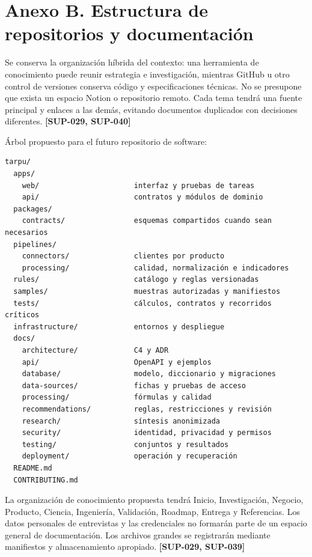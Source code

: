 \documentclass[10pt,a4paper]{article}
\begin{document}
\clearpage\section{Anexo B. Estructura de repositorios y documentación}\label{anexo-b-estructura-de-repositorios-y-documentación}

Se conserva la organización híbrida del contexto: una herramienta de conocimiento puede reunir estrategia e investigación, mientras GitHub u otro control de versiones conserva código y especificaciones técnicas. No se presupone que exista un espacio Notion o repositorio remoto. Cada tema tendrá una fuente principal y enlaces a las demás, evitando documentos duplicados con decisiones diferentes. \textbf{[SUP-029, SUP-040]}


Árbol propuesto para el futuro repositorio de software:


\begin{lstlisting}
tarpu/
  apps/
    web/                      interfaz y pruebas de tareas
    api/                      contratos y módulos de dominio
  packages/
    contracts/                esquemas compartidos cuando sean necesarios
  pipelines/
    connectors/               clientes por producto
    processing/               calidad, normalización e indicadores
  rules/                      catálogo y reglas versionadas
  samples/                    muestras autorizadas y manifiestos
  tests/                      cálculos, contratos y recorridos críticos
  infrastructure/             entornos y despliegue
  docs/
    architecture/             C4 y ADR
    api/                      OpenAPI y ejemplos
    database/                 modelo, diccionario y migraciones
    data-sources/             fichas y pruebas de acceso
    processing/               fórmulas y calidad
    recommendations/          reglas, restricciones y revisión
    research/                 síntesis anonimizada
    security/                 identidad, privacidad y permisos
    testing/                  conjuntos y resultados
    deployment/               operación y recuperación
  README.md
  CONTRIBUTING.md
\end{lstlisting}

La organización de conocimiento propuesta tendrá Inicio, Investigación, Negocio, Producto, Ciencia, Ingeniería, Validación, Roadmap, Entrega y Referencias. Los datos personales de entrevistas y las credenciales no formarán parte de un espacio general de documentación. Los archivos grandes se registrarán mediante manifiestos y almacenamiento apropiado. \textbf{[SUP-029, SUP-039]}
\end{document}
